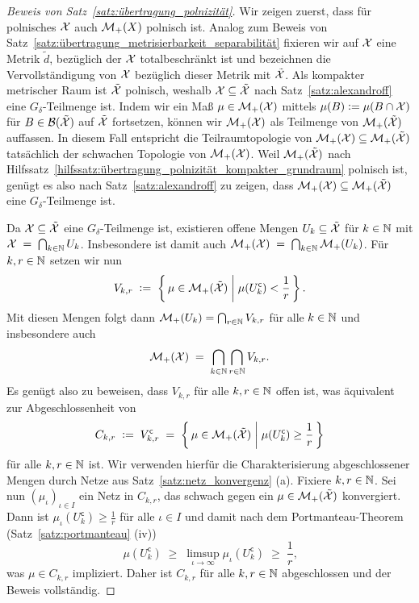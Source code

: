 \documentclass[../thesis/thesis.tex]{subfiles}
\begin{document}
	\begin{proof}[Beweis von Satz~\ref{satz:übertragung_polnizität}]
		Wir zeigen zuerst, dass für polnisches $\mathcal{X}$ auch $\mathcal{M}_{+}(X)$ polnisch ist. Analog zum Beweis von Satz~\ref{satz:übertragung_metrisierbarkeit_separabilität} fixieren wir auf 
		$\mathcal{X}$ eine Metrik $\tilde{d}$, bezüglich der $\mathcal{X}$ totalbeschränkt ist und
		bezeichnen die Vervollständigung von $\mathcal{X}$ bezüglich dieser Metrik mit $\tilde{\mathcal{X}}$. Als kompakter metrischer Raum ist $\tilde{\mathcal{X}}$ polnisch, weshalb $\mathcal{X} \subseteq \tilde{\mathcal{X}}$
		nach Satz~\ref{satz:alexandroff} eine $G_\delta$-Teilmenge ist. Indem wir ein Maß $\mu \in \mathcal{M}_{+}(\mathcal{X})$ mittels 
		$\mu(B) \vcentcolon = \mu(B \cap \mathcal{X})$ für $B \in \mathcal{B}(\tilde{\mathcal{X}})$ auf $\tilde{\mathcal{X}}$ fortsetzen, können wir $\mathcal{M}_{+}(\mathcal{X})$ als Teilmenge von $\mathcal{M}_{+}(\tilde{\mathcal{X}})$
		auffassen. In diesem Fall entspricht die Teilraumtopologie von $\mathcal{M}_{+}(\mathcal{X}) \subseteq \mathcal{M}_{+}(\tilde{\mathcal{X}})$ tatsächlich der schwachen Topologie von $\mathcal{M}_{+}(\mathcal{X})$. Weil $\mathcal{M}_{+}(\tilde{\mathcal{X}})$ nach 
		Hilfssatz~\ref{hilfssatz:übertragung_polnizität_kompakter_grundraum} polnisch ist, genügt es also nach Satz~\ref{satz:alexandroff} zu zeigen, 
		dass $\mathcal{M}_{+}(\mathcal{X}) \subseteq \mathcal{M}_{+}(\tilde{\mathcal{X}})$ eine $G_\delta$-Teilmenge ist.
		
		Da $\mathcal{X} \subseteq \tilde{\mathcal{X}}$ eine $G_\delta$-Teilmenge ist, existieren offene Mengen $U_k \subseteq \tilde{\mathcal{X}}$ für $k \in \mathbb{N}$ mit 
		$\mathcal{X} \; = \; \bigcap_{k \in \mathbb{N}} U_k$. Insbesondere ist damit auch
		$\mathcal{M}_{+}(\mathcal{X}) \; = \; \bigcap_{k \in \mathbb{N}} \mathcal{M}_{+}(U_k)$.
		Für $k, r \in \mathbb{N}$ setzen wir nun
		\[ V_{k, r} \; \vcentcolon = \; \left\{\, \mu \in \mathcal{M}_{+}(\tilde{\mathcal{X}}) \; \middle| \; \mu(U_k^{\mathsf{c}}) < \frac{1}{r} \,\right\} \text{.} \]
		Mit diesen Mengen folgt dann $\mathcal{M}_{+}(U_k) = \bigcap_{r \in \mathbb{N}} V_{k, r}$ für alle $k \in \mathbb{N}$ und insbesondere auch
		\[ \mathcal{M}_{+}(\mathcal{X}) \; = \; \bigcap_{k \in \mathbb{N}} \bigcap_{r \in \mathbb{N}} V_{k, r} \text{.} \]
		Es genügt also zu beweisen, dass $V_{k, r}$ für alle $k, r \in \mathbb{N}$ offen ist, was äquivalent zur Abgeschlossenheit von 
		\[C_{k, r} \; \vcentcolon = \; V_{k, r}^{\mathsf{c}} \; = \; \left\{\, \mu \in \mathcal{M}_{+}(\tilde{\mathcal{X}}) \; \middle| \; \mu(U_k^{\mathsf{c}}) \geq \frac{1}{r} \,\right\} \] 
		für alle $k, r \in \mathbb{N}$ ist. Wir verwenden hierfür die Charakterisierung abgeschlossener Mengen durch Netze aus Satz~\ref{satz:netz_konvergenz} (a).
		Fixiere $k, r \in \mathbb{N}$. Sei nun $(\mu_\iota)_{\iota \in I}$ ein Netz in $C_{k, r}$, das schwach gegen ein $\mu \in \mathcal{M}_{+}(\tilde{\mathcal{X}})$ konvergiert.
		Dann ist $\mu_\iota(U_k^{\mathsf{c}}) \geq \frac{1}{r}$ für alle $\iota \in I$ und damit nach dem Portmanteau-Theorem (Satz~\ref{satz:portmanteau} (iv))
		\[ \mu(U_k^{\mathsf{c}}) \; \geq \; \limsup_{\iota \to \infty} \mu_\iota(U_k^{\mathsf{c}}) \; \geq \; \frac{1}{r} \text{,} \]
		was $\mu \in C_{k, r}$ impliziert. Daher ist $C_{k, r}$ für alle $k, r \in \mathbb{N}$ abgeschlossen und der Beweis vollständig.
		

\end{proof}
\end{document}
